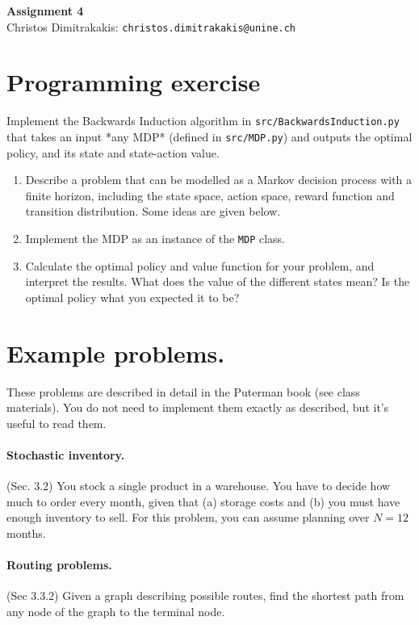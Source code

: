 \documentclass[twoside,a4paper]{article}
\begin{document}
\Large{\bf Assignment 4}
\vspace{1em}
\\
\large{Christos Dimitrakakis:} \texttt{christos.dimitrakakis@unine.ch}

\section{Programming exercise}
\begin{exercise}[In class] Implement the Backwards Induction algorithm in \verb!src/BackwardsInduction.py! that takes an input *any MDP* (defined in \verb|src/MDP.py|) and outputs the optimal policy, and its state and state-action value.
\end{exercise}

\begin{exercise}
  \begin{enumerate}  
  \item Describe a problem that can be modelled as a Markov decision process with a finite horizon, including the state space, action space, reward function and transition distribution. Some ideas are given below.
  \item Implement the MDP as an instance of the \verb|MDP| class.
  \item Calculate the optimal policy and value function for your problem, and interpret the results. What does the value of the different states mean? Is the optimal policy what you expected it to be? 
  \end{enumerate}
\end{exercise}

\iftrue
  \section{Example problems.}
  These problems are described in detail in the Puterman book (see class materials). You do not need to implement them exactly as described, but it's useful to read them. 
  
  \paragraph{Stochastic inventory.}  (Sec. 3.2) You stock a single product in a warehouse. You have to decide how much to order every month, given that (a) storage costs and (b) you must have enough inventory to sell. For this problem, you can assume planning over $N=12$ months. 
  \paragraph{Routing problems.}  (Sec 3.3.2) Given a graph describing possible routes, find the shortest path from any node of the graph to the terminal node.
\end{document}
